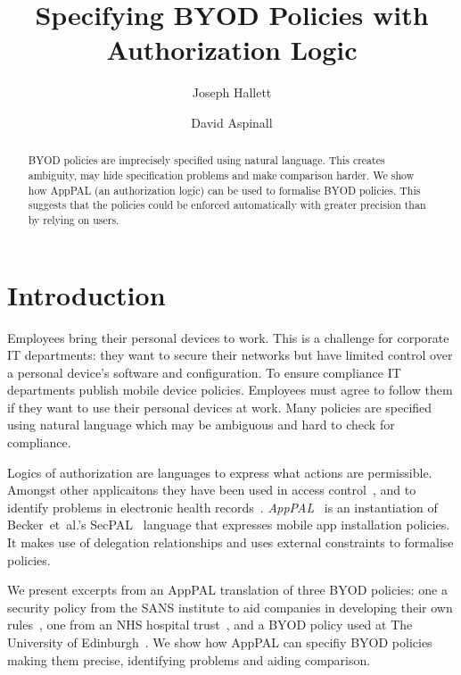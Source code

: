 \documentclass{easychair}
\title{Specifying BYOD Policies with Authorization Logic}
\author{
  Joseph Hallett\inst{1}
  \and
  David Aspinall\inst{1}
}
\institute{
  University of Edinburgh
}
\begin{document}
\maketitle

\begin{abstract}
  BYOD policies are imprecisely specified using natural language.
  This creates ambiguity, may hide specification problems and make comparison harder.
  We show how AppPAL (an authorization logic) can be used to formalise BYOD policies.
  This suggests that the policies could be enforced automatically with greater precision than by relying on users.
\end{abstract}

\section{Introduction}

Employees bring their personal devices to work.
This is a challenge for corporate IT departments:
  they want to secure their networks but have limited control over a personal device's software and configuration.
To ensure compliance IT departments publish mobile device policies.
Employees must agree to follow them if they want to use their personal devices at work.
Many policies are specified using natural language which may be ambiguous and hard to check for compliance.

Logics of authorization are languages to express what actions are permissible.
Amongst other applicaitons they have been used in access control~\cite{Abadi:2003kta}, and to identify problems in electronic health records~\cite{Becker:2004fi}.
\emph{AppPAL}~\cite{Hallett:2016vu} is an instantiation of Becker~et~al{.}'s SecPAL~\cite{Becker:2006vh} language that expresses mobile app installation policies.
It makes use of delegation relationships and uses external constraints to formalise policies.

We present excerpts from an AppPAL translation of three BYOD policies: 
    one a security policy from the SANS institute to aid companies in developing their own rules~\cite{Guerin:2008we}, 
    one from an NHS hospital trust~\cite{Kennington:2014tr},
    and a BYOD policy used at The University of Edinburgh~\cite{Williamson:2015tr}.
We show how AppPAL can specifiy BYOD policies making them precise, identifying problems and aiding comparison.
\end{document}
